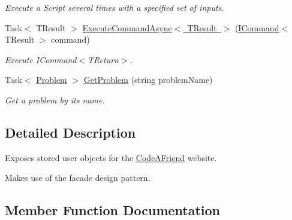 \begin{DoxyCompactItemize}
\begin{DoxyCompactList}\small\item\em Execute a Script several times with a specified set of inputs.\end{DoxyCompactList}\item 
Task$<$ T\+Result $>$ \mbox{\hyperlink{interface_code_a_friend_1_1_facade_1_1_i_code_a_friend_facade_a028d0f66e63a4977451e15a0a79c7f19}{Execute\+Command\+Async$<$ T\+Result $>$}} (\mbox{\hyperlink{interface_code_a_friend_1_1_data_model_1_1_i_command}{I\+Command}}$<$ T\+Result $>$ command)
\begin{DoxyCompactList}\small\item\em Execute I\+Command$<$\+T\+Return$>$.\end{DoxyCompactList}\item 
Task$<$ \mbox{\hyperlink{class_code_a_friend_1_1_data_model_1_1_problem}{Problem}} $>$ \mbox{\hyperlink{interface_code_a_friend_1_1_facade_1_1_i_code_a_friend_facade_a044ae5a5e7d55904f0fd43eca50650cb}{Get\+Problem}} (string problem\+Name)
\begin{DoxyCompactList}\small\item\em Get a problem by its name.\end{DoxyCompactList}\end{DoxyCompactItemize}


\subsection{Detailed Description}
Exposes stored user objects for the \mbox{\hyperlink{namespace_code_a_friend}{Code\+A\+Friend}} website. 

Makes use of the facade design pattern.

\subsection{Member Function Documentation}
\mbox{\label{interface_code_a_friend_1_1_facade_1_1_i_code_a_friend_facade_a028d0f66e63a4977451e15a0a79c7f19}} 
